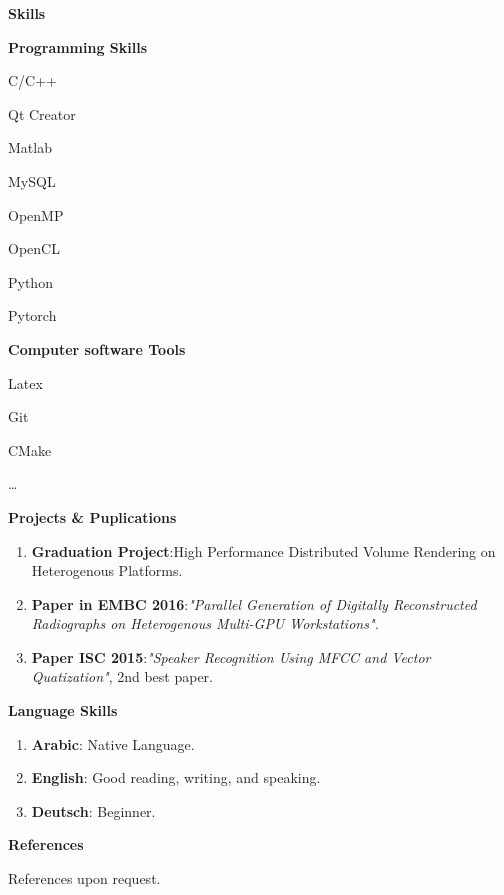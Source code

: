 \documentclass[a4paper,12pt,final]{memoir}
\newcommand{\Sep}{\vspace{1.5em}}
\newcommand{\SmallSep}{\vspace{0.5em}}
\newcommand{\CVSection}[1]
	{\Large\textbf{#1}\par
	\SmallSep\normalsize\normalfont}
\newcommand{\CVItem}[1]
	{\textbf{\color{RoyalBlue} #1}}
\begin{document}
\CVSection{Skills}
\CVItem{Programming Skills}
\begin{multicols}{3}
\begin{compactitem}[\color{RoyalBlue}$\circ$]
	\item C/C++ 
	\item Qt Creator
	\item Matlab
	\item MySQL
	\item OpenMP
	\item OpenCL
	\item Python
	\item Pytorch
\end{compactitem}
\end{multicols}
\SmallSep

\CVItem{Computer software Tools}
\begin{multicols}{3}
\begin{compactitem}[\color{RoyalBlue}$\circ$]
	\item Latex
	\item Git 
	\item CMake
	\item \ldots
\end{compactitem}
\end{multicols}
\Sep 




\clearpage
\framebreak
\framebreak

\CVSection{Projects \& Puplications}
\begin{enumerate}
\item \textbf{Graduation Project}:High Performance Distributed Volume Rendering on Heterogenous Platforms.
\item \textbf{Paper in EMBC 2016}:\textit{"Parallel Generation of Digitally Reconstructed Radiographs on Heterogenous Multi-GPU Workstations".}
\item \textbf{Paper ISC 2015}:\textit{"Speaker Recognition Using MFCC and Vector Quatization"}, 2nd best paper.
\end{enumerate}
\Sep

\CVSection{Language Skills}
\begin{enumerate}
\item \textbf{Arabic}: Native Language.
\item \textbf{English}: Good reading, writing, and speaking.
\item \textbf{Deutsch}: Beginner.
\end{enumerate}
\Sep


\CVSection{References}
References upon request.

\end{document}
